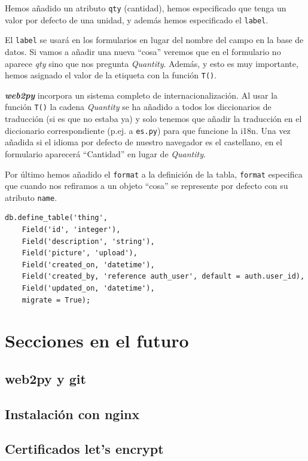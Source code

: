 \documentclass[
  12pt,
  spanish,
]{article}
\begin{document}
Hemos añadido un atributo \texttt{qty} (cantidad), hemos especificado
que tenga un valor por defecto de una unidad, y además hemos
especificado el \texttt{label}.

El \texttt{label} se usará en los formularios en lugar del nombre del
campo en la base de datos. Si vamos a añadir una nueva ``cosa'' veremos
que en el formulario no aparece \emph{qty} sino que nos pregunta
\emph{Quantity}. Además, y esto es muy importante, hemos asignado el
valor de la etiqueta con la función \texttt{T()}.

\textbf{\emph{web2py}} incorpora un sistema completo de
internacionalización. Al usar la función \texttt{T()} la cadena
\emph{Quantity} se ha añadido a todos los diccionarios de traducción (si
es que no estaba ya) y solo tenemos que añadir la traducción en el
diccionario correspondiente (p.ej. a \texttt{es.py}) para que funcione
la i18n. Una vez añadida si el idioma por defecto de nuestro navegador
es el castellano, en el formulario aparecerá ``Cantidad'' en lugar de
\emph{Quantity}.

Por último hemos añadido el \texttt{format} a la definición de la tabla,
\texttt{format} especifica que cuando nos refiramos a un objeto ``cosa''
se represente por defecto con su atributo \texttt{name}.

\begin{verbatim}
db.define_table('thing',
    Field('id', 'integer'),
    Field('description', 'string'),
    Field('picture', 'upload'),
    Field('created_on, 'datetime'),
    Field('created_by, 'reference auth_user', default = auth.user_id),
    Field('updated_on, 'datetime'),
    migrate = True);
\end{verbatim}

\hypertarget{secciones-en-el-futuro}{%
\section{Secciones en el futuro}\label{secciones-en-el-futuro}}

\hypertarget{web2py-y-git}{%
\subsection{web2py y git}\label{web2py-y-git}}

\hypertarget{instalaciuxf3n-con-nginx}{%
\subsection{Instalación con nginx}\label{instalaciuxf3n-con-nginx}}

\hypertarget{certificados-lets-encrypt}{%
\subsection{Certificados let's
encrypt}\label{certificados-lets-encrypt}}
\end{document}
